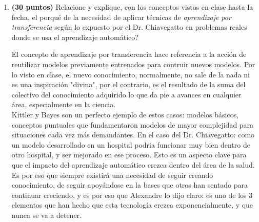 \documentclass[english]{article}
\begin{document}
\begin{enumerate}
\begin{enumerate}
\item \textbf{(30 puntos)} Relacione y explique, con los conceptos vistos
en clase hasta la fecha, el porqu\'{e} de la necesidad de aplicar
t\'{e}cnicas de \emph{aprendizaje por transferencia }seg\'{u}n lo
expuesto por el Dr. Chiavegatto en problemas reales donde se usa el
aprendizaje autom\'{a}tico?

El concepto de aprendizaje por transferencia hace referencia a la acci\'{o}n de reutilizar modelos previamente entrenados para contruir nuevos modelos. Por lo visto en clase, el nuevo conocimiento, normalmente, no sale de la nada ni es una inspiraci\'{o}n "divina", por el contrario, es el resultado de la suma del colectivo del conocimiento adquirido lo que da pie a avances en cualquier \'{a}rea, especialmente en la ciencia.\\

Kittler y Bayes son un perfecto ejemplo de estos casos: modelos b\'{a}sicos, conceptos puntuales que fundamentaron modelos de mayor complejidad para situaciones cada vez m\'{a}s demandantes. En el caso del Dr. Chiavegatto: como un modelo desarrollado en un hospital podria funcionar muy bien dentro de otro hospital, y ser mejorado en ese proceso. Esto es un aspecto clave para que el impacto del aprendizaje autom\'{a}tico crezca dentro del \'{a}rea de la salud.\\

Es por eso que siempre existir\'{a} una necesidad de seguir creando conocimiento, de seguir apoy\'{a}ndose en la bases que otros han sentado para continuar creciendo, y es por eso que Alexandre lo dijo claro: es uno de los 3 elementos que han hecho que esta tecnolog\'{i}a crezca exponencialmente, y que nunca se va a detener.

\end{enumerate}
\end{enumerate}

\printbibliography[
heading=bibintoc,
title={Bibliograf\'{i}a}
]
\end{document}
